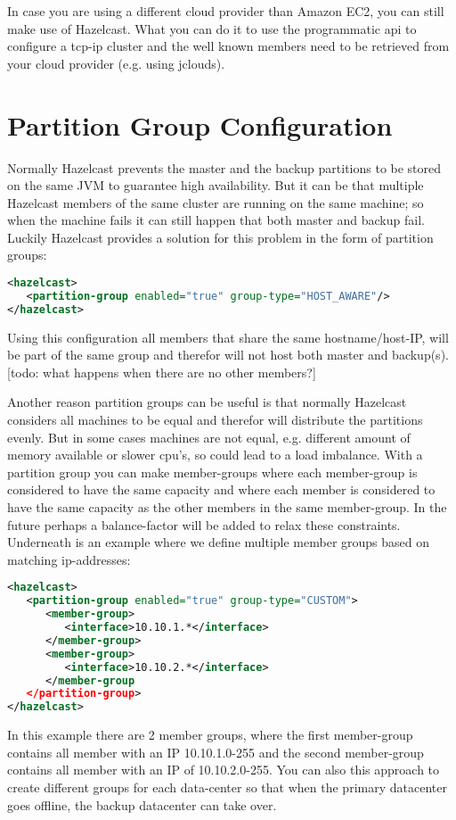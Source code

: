 In case you are using a different cloud provider than Amazon EC2, you can still make use of Hazelcast. What you can do it to use the programmatic api to configure a tcp-ip cluster and the well known members need to be retrieved from your cloud provider (e.g. using jclouds).

\section{Partition Group Configuration}
Normally Hazelcast prevents the master and the backup partitions to be stored on the same JVM to guarantee high availability. But it can be that multiple Hazelcast members of the same cluster are running on the same machine; so when the machine fails it can still happen that both master and backup fail. Luckily Hazelcast provides a solution for this problem in the form of partition groups:
\begin{lstlisting}[language=xml]
<hazelcast>
   <partition-group enabled="true" group-type="HOST_AWARE"/>
</hazelcast>
\end{lstlisting}
Using this configuration all members that share the same hostname/host-IP, will be part of the same group and therefor will not host both master and backup(s). [todo: what happens when there are no other members?] 

Another reason partition groups can be useful is that normally Hazelcast considers all machines to be equal and therefor will distribute the partitions evenly. But in some cases machines are not equal, e.g. different amount of memory available or slower cpu's, so could lead to a load imbalance. With a partition group you can make member-groups where each member-group is considered to have the same capacity and where each member is considered to have the same capacity as the other members in the same member-group. In the future perhaps a balance-factor will be added to relax these constraints. Underneath is an example where we define multiple member groups based on matching ip-addresses:
\begin{lstlisting}[language=xml]
<hazelcast>
   <partition-group enabled="true" group-type="CUSTOM">
      <member-group>
         <interface>10.10.1.*</interface>
      </member-group>
      <member-group>
         <interface>10.10.2.*</interface>
      </member-group
   </partition-group>
</hazelcast>
\end{lstlisting}
In this example there are 2 member groups, where the first member-group contains all member with an IP 10.10.1.0-255 and the second member-group contains all member with an IP of 10.10.2.0-255. You can also this approach to create different groups for each data-center so that when the primary datacenter goes offline, the backup datacenter can take over.

